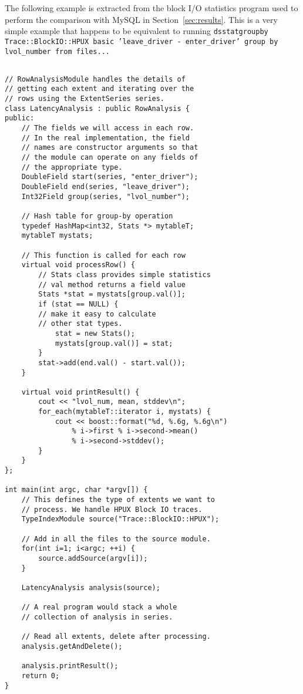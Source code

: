\documentclass{acm_proc_article-sp}
\begin{document}
The following example is extracted from the block I/O statistics
program used to perform the comparison with MySQL in
Section~\ref{sec:results}.  This is a very simple example that happens
to be equivalent to running {\tt dsstatgroupby Trace::BlockIO::HPUX
basic 'leave\_driver - enter\_driver' group by lvol\_number from
files...}

{ \footnotesize
\begin{verbatim}

// RowAnalysisModule handles the details of 
// getting each extent and iterating over the 
// rows using the ExtentSeries series.
class LatencyAnalysis : public RowAnalysis {
public:
    // The fields we will access in each row. 
    // In the real implementation, the field 
    // names are constructor arguments so that 
    // the module can operate on any fields of
    // the appropriate type.
    DoubleField start(series, "enter_driver");
    DoubleField end(series, "leave_driver");
    Int32Field group(series, "lvol_number");

    // Hash table for group-by operation
    typedef HashMap<int32, Stats *> mytableT;
    mytableT mystats;

    // This function is called for each row
    virtual void processRow() {
        // Stats class provides simple statistics
        // val method returns a field value
        Stats *stat = mystats[group.val()];
        if (stat == NULL) {
	    // make it easy to calculate 
	    // other stat types.
            stat = new Stats();
            mystats[group.val()] = stat;
        }
        stat->add(end.val() - start.val());
    }

    virtual void printResult() {
        cout << "lvol_num, mean, stddev\n";
        for_each(mytableT::iterator i, mystats) {
            cout << boost::format("%d, %.6g, %.6g\n") 
                % i->first % i->second->mean() 
                % i->second->stddev();
        }
    }
};

int main(int argc, char *argv[]) {
    // This defines the type of extents we want to 
    // process. We handle HPUX Block IO traces.
    TypeIndexModule source("Trace::BlockIO::HPUX");

    // Add in all the files to the source module.
    for(int i=1; i<argc; ++i) {
        source.addSource(argv[i]);
    }

    LatencyAnalysis analysis(source);

    // A real program would stack a whole 
    // collection of analysis in series.

    // Read all extents, delete after processing.
    analysis.getAndDelete();
    
    analysis.printResult();
    return 0;
}

\end{verbatim}
}
\end{document}
